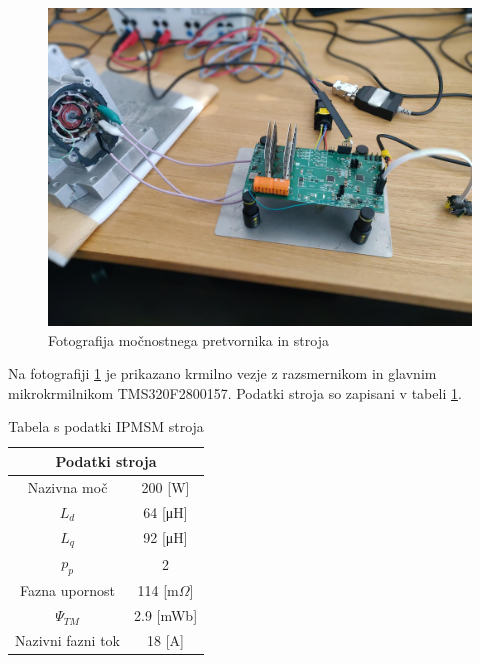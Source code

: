 \documentclass[a4paper,twoside,openright,12pt,slovene]{book}
\begin{document}
\begin{figure}[!htbp]
    \centering
    \includegraphics[width=0.99\columnwidth]{Slike/EksperimentiSlika.jpg}
    \caption{\label{experimentiSlika} Fotografija močnostnega pretvornika in stroja}
\end{figure}

Na fotografiji \ref{experimentiSlika} je prikazano krmilno vezje z razsmernikom in glavnim mikrokrmilnikom TMS320F2800157. Podatki stroja so zapisani v tabeli \ref{podatkiStroja}.


\begin{table}[h]                           
 \centering
    \begin{tabular}{|c|c|}
    \hline
    \multicolumn{2}{|c|}{\textbf{Podatki stroja}} \\ \hline

    Nazivna moč             &   200 [W]     \\ \hline
    $L_d$                   &   64 [μH]     \\ \hline
    $L_q$                   &   92 [μH]     \\ \hline
    $p_p$                   &   2           \\ \hline
    Fazna upornost          &   114 [m$\Omega$]    \\ \hline
    $\Psi_{TM}$             &   2.9 [mWb]   \\ \hline
    Nazivni fazni tok       &   18 [A]      \\ \hline

    \end{tabular}
    \caption{Tabela s podatki IPMSM stroja}
    \label{podatkiStroja}                            

\end{table}
\end{document}
